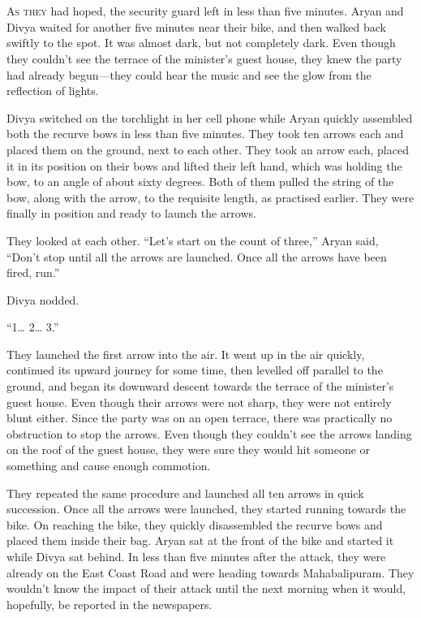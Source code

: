 \chapter{}

\lettrine{A}{s they} had hoped, the security guard left in less than five minutes.
Aryan and Divya waited for another five minutes near their bike, and then walked
back swiftly to the spot. It was almost dark, but not completely dark. Even though they couldn't see the terrace of the minister's guest house, they knew the party had already
begun—they could hear the music and see the glow from the reflection of
lights.

Divya switched on the torchlight in her cell phone while Aryan quickly
assembled both the recurve bows in less than five minutes. They took ten arrows
each and placed them on the ground, next to each other. They took an arrow each,
placed it in its position on their bows and lifted their left hand, which was
holding the bow, to an angle of about sixty degrees. Both of them pulled the
string of the bow, along with the arrow, to the requisite length, as practised
earlier. They were finally in position and ready to launch the arrows.

They looked at each other. “Let's start on the count of three,” Aryan said,
“Don't stop until all the arrows are launched. Once all the arrows have been
fired, run.”

Divya nodded.

“1… 2… 3.”

They launched the first arrow into the air. It went up in the air quickly,
continued its upward journey for some time, then levelled off parallel to the ground,
and began its downward descent towards the terrace of the minister's guest
house. Even though their arrows were not sharp, they were not entirely blunt
either. Since the party was on an open terrace, there was practically no
obstruction to stop the arrows. Even though they couldn't see the arrows landing
on the roof of the guest house, they were sure they would hit someone or something
and cause enough commotion.

They repeated the same procedure and launched all ten arrows in quick
succession. Once all the arrows were launched, they started running towards the
bike. On reaching the bike, they quickly disassembled the recurve bows and
placed them inside their bag. Aryan sat at the front of the bike and started it
while Divya sat behind. In less than five minutes after the attack, they were
already on the East Coast Road and were heading towards Mahabalipuram. They
wouldn't know the impact of their attack until the next morning when it
would, hopefully, be reported in the newspapers.

